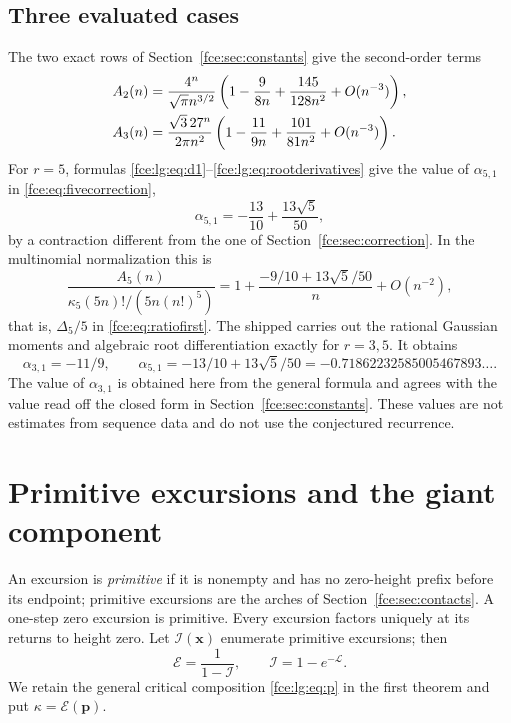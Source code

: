 \documentclass[11pt,a4paper]{article}
\numberwithin{equation}{section}
\theoremstyle{definition}\newtheorem{definition}[theorem]{Definition}
\theoremstyle{remark}\newtheorem{remark}[theorem]{Remark}
\newcommand{\E}{\mathcal E}
\newcommand{\Lcal}{\mathcal L}
\begin{document}
\subsection{Three evaluated cases}
The two exact rows of Section~\ref{fce:sec:constants} give the second-order
terms
\begin{align}\label{fce:lg:eq:r23corr}
 A_2(n)&=\frac{4^n}{\sqrt\pi n^{3/2}}
       \left(1-\frac9{8n}+\frac{145}{128n^2}+O(n^{-3})\right),\notag\\
 A_3(n)&=\frac{\sqrt3\,27^n}{2\pi n^2}
       \left(1-\frac{11}{9n}+\frac{101}{81n^2}+O(n^{-3})\right).
\end{align}
For $r=5$, formulas \eqref{fce:lg:eq:d1}--\eqref{fce:lg:eq:rootderivatives}
give the value of $\alpha_{5,1}$ in \eqref{fce:eq:fivecorrection},
\[
 \alpha_{5,1}=-\frac{13}{10}+\frac{13\sqrt5}{50},
\]
by a contraction different from the one of Section~\ref{fce:sec:correction}.
In the multinomial normalization this is
\begin{equation}\label{fce:lg:eq:r5ratio}
 \frac{A_5(n)}{\kappa_5(5n)!/(5n(n!)^5)}
 =1+\frac{-9/10+13\sqrt5/50}{n}+O(n^{-2}),
\end{equation}
that is, $\Delta_5/5$ in \eqref{fce:eq:ratiofirst}. The shipped
 carries out the rational
Gaussian moments and algebraic root differentiation exactly for $r=3,5$.
It obtains
\[
 \alpha_{3,1}=-11/9,\qquad \alpha_{5,1}=-13/10+13\sqrt5/50
                      =-0.71862232585005467893\ldots.
\]
The value of $\alpha_{3,1}$ is obtained here from the general formula and
agrees with the value read off the closed form in
Section~\ref{fce:sec:constants}. These values are not estimates from
sequence data and do not use the conjectured recurrence.

\section{Primitive excursions and the giant component}\label{fce:lg:sec:components}
An excursion is \emph{primitive} if it is nonempty and has no zero-height
prefix before its endpoint; primitive excursions are the arches of
Section~\ref{fce:sec:contacts}. A one-step zero excursion is primitive.
Every excursion factors uniquely at its returns to height zero. Let
$\mathcal I(\boldsymbol x)$ enumerate primitive excursions; then
\begin{equation}\label{fce:lg:eq:I}
 \E=\frac1{1-\mathcal I},\qquad \mathcal I=1-e^{-\Lcal}.
\end{equation}
We retain the general critical composition \eqref{fce:lg:eq:p} in the first
theorem and put $\kappa=\E(\boldsymbol p)$.
\end{document}
